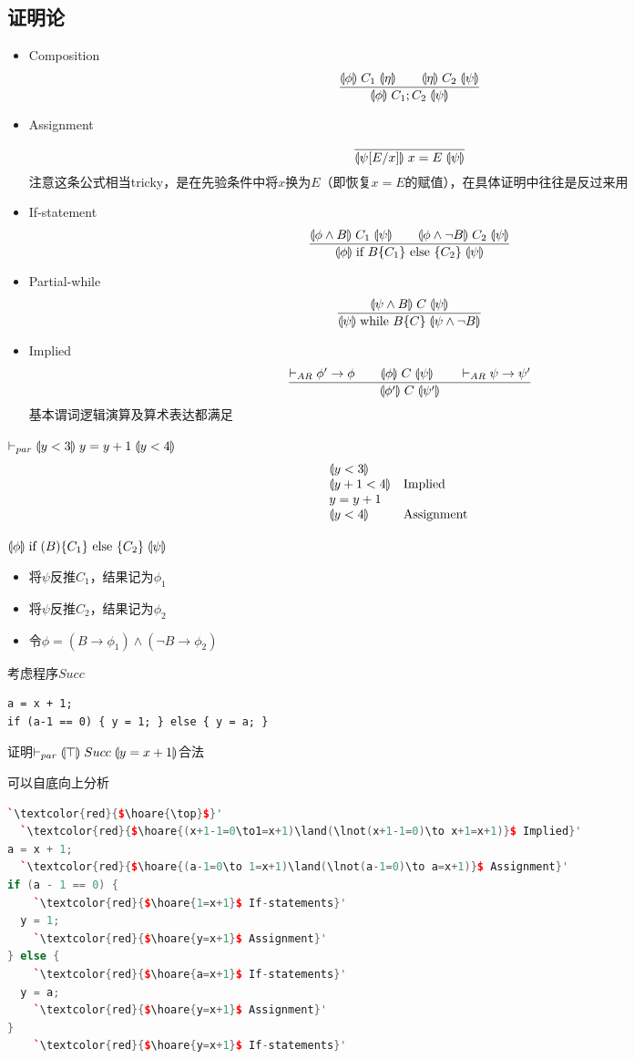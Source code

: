 \subsection{证明论}
\begin{itemize}
	\item Composition
	\[\frac{\llparenthesis \phi\rrparenthesis\;C_1\;\llparenthesis \eta\rrparenthesis\qquad\llparenthesis \eta\rrparenthesis\;C_2\;\llparenthesis \psi\rrparenthesis}{\llparenthesis \phi\rrparenthesis\;C_1;C_2\;\llparenthesis \psi\rrparenthesis}\]
	\item Assignment
	\[\frac{}{\llparenthesis \psi[E/x]\rrparenthesis\;x=E\;\llparenthesis \psi\rrparenthesis}\]
	注意这条公式相当tricky，是在先验条件中将$x$换为$E$（即恢复$x=E$的赋值），在具体证明中往往是反过来用
	\item If-statement
	\[\frac{\llparenthesis \phi\land B\rrparenthesis\;C_1\;\llparenthesis \psi\rrparenthesis\qquad\llparenthesis \phi\land\lnot B\rrparenthesis\;C_2\;\llparenthesis \psi\rrparenthesis}{\llparenthesis \phi\rrparenthesis\;\text{if }B\{C_1\}\text{ else }\{C_2\}\;\llparenthesis \psi\rrparenthesis}\]
	\item Partial-while
	\[\frac{\llparenthesis \psi\land B\rrparenthesis\;C\;\llparenthesis \psi\rrparenthesis}{\llparenthesis \psi\rrparenthesis\;\text{while }B\{C\}\;\llparenthesis \psi\land\lnot B\rrparenthesis}\]
	\item Implied
	\[\frac{\vdash_{AR}\phi'\to\phi\qquad\llparenthesis \phi\rrparenthesis\;C\;\llparenthesis \psi\rrparenthesis\qquad\vdash_{AR}\psi\to\psi'}{\llparenthesis \phi'\rrparenthesis\;C\;\llparenthesis \psi'\rrparenthesis}\]
	基本谓词逻辑演算及算术表达都满足
\end{itemize}
\begin{example}
$\vdash_{par}\llparenthesis y<3\rrparenthesis\;y=y+1\;\llparenthesis y<4\rrparenthesis$
\[\begin{array}{ll}
\llparenthesis y<3\rrparenthesis &\\
\llparenthesis y+1 < 4\rrparenthesis & \text{Implied}\\
y = y+1 &\\
\llparenthesis y<4\rrparenthesis &\text{Assignment}
\end{array}\]
\end{example}

$\llparenthesis \phi\rrparenthesis\;\text{if }(B)\{C_1\}\text{ else }\{C_2\}\;\llparenthesis \psi\rrparenthesis$
\begin{itemize}
	\item 将$\psi$反推$C_1$，结果记为$\phi_1$
	\item 将$\psi$反推$C_2$，结果记为$\phi_2$
	\item 令$\phi=(B\to\phi_1)\land(\lnot B\to\phi_2)$
\end{itemize}
\begin{example}
考虑程序$Succ$
\begin{lstlisting}
a = x + 1;
if (a-1 == 0) { y = 1; } else { y = a; }
\end{lstlisting}
证明$\vdash_{par}\llparenthesis \top\rrparenthesis\;Succ\;\llparenthesis y=x+1\rrparenthesis$合法
\end{example}
\begin{analysis}
可以自底向上分析
\begin{lstlisting}[language=c++]
  `\textcolor{red}{$\hoare{\top}$}'
  `\textcolor{red}{$\hoare{(x+1-1=0\to1=x+1)\land(\lnot(x+1-1=0)\to x+1=x+1)}$ Implied}'
a = x + 1;
  `\textcolor{red}{$\hoare{(a-1=0\to 1=x+1)\land(\lnot(a-1=0)\to a=x+1)}$ Assignment}'
if (a - 1 == 0) {
    `\textcolor{red}{$\hoare{1=x+1}$ If-statements}'
  y = 1;
    `\textcolor{red}{$\hoare{y=x+1}$ Assignment}'
} else {
    `\textcolor{red}{$\hoare{a=x+1}$ If-statements}'
  y = a;
    `\textcolor{red}{$\hoare{y=x+1}$ Assignment}'
}
    `\textcolor{red}{$\hoare{y=x+1}$ If-statements}'
\end{lstlisting}
\end{analysis}

